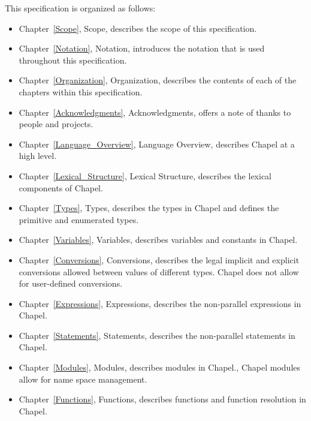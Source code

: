 \label{Organization}

This specification is organized as follows:
\begin{itemize}

\item
Chapter~\ref{Scope}, Scope, describes the scope of this specification.

\item
Chapter~\ref{Notation}, Notation, introduces the notation that is used
throughout this specification.

\item
Chapter~\ref{Organization}, Organization, describes the contents of
each of the chapters within this specification.

\item
Chapter~\ref{Acknowledgments}, Acknowledgments, offers a note of
thanks to people and projects.

\item
Chapter~\ref{Language_Overview}, Language Overview, describes Chapel
at a high level.

\item
Chapter~\ref{Lexical_Structure}, Lexical Structure, describes the
lexical components of Chapel.

\item
Chapter~\ref{Types}, Types, describes the types in Chapel and defines
the primitive and enumerated types.

\item
Chapter~\ref{Variables}, Variables, describes variables and constants
in Chapel.

\item
Chapter~\ref{Conversions}, Conversions, describes the legal implicit
and explicit conversions allowed between values of different types.
Chapel does not allow for user-defined conversions.

\item
Chapter~\ref{Expressions}, Expressions, describes the non-parallel
expressions in Chapel.

\item
Chapter~\ref{Statements}, Statements, describes the non-parallel
statements in Chapel.

\item
Chapter~\ref{Modules}, Modules, describes modules in Chapel., Chapel
modules allow for name space management.

\item
Chapter~\ref{Functions}, Functions, describes functions and function
resolution in Chapel.


\end{itemize}
